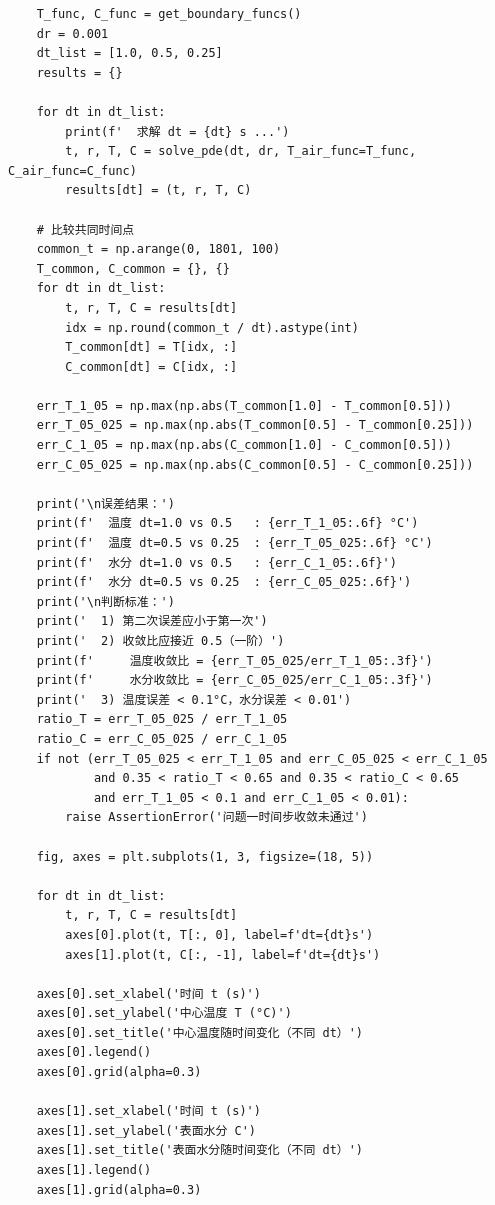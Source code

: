 \documentclass[withoutpreface,bwprint]{cumcm_thesis}
\begin{document}
\begin{appendices}
\begin{lstlisting}
    T_func, C_func = get_boundary_funcs()
    dr = 0.001
    dt_list = [1.0, 0.5, 0.25]
    results = {}

    for dt in dt_list:
        print(f'  求解 dt = {dt} s ...')
        t, r, T, C = solve_pde(dt, dr, T_air_func=T_func, C_air_func=C_func)
        results[dt] = (t, r, T, C)

    # 比较共同时间点
    common_t = np.arange(0, 1801, 100)
    T_common, C_common = {}, {}
    for dt in dt_list:
        t, r, T, C = results[dt]
        idx = np.round(common_t / dt).astype(int)
        T_common[dt] = T[idx, :]
        C_common[dt] = C[idx, :]

    err_T_1_05 = np.max(np.abs(T_common[1.0] - T_common[0.5]))
    err_T_05_025 = np.max(np.abs(T_common[0.5] - T_common[0.25]))
    err_C_1_05 = np.max(np.abs(C_common[1.0] - C_common[0.5]))
    err_C_05_025 = np.max(np.abs(C_common[0.5] - C_common[0.25]))

    print('\n误差结果：')
    print(f'  温度 dt=1.0 vs 0.5   : {err_T_1_05:.6f} °C')
    print(f'  温度 dt=0.5 vs 0.25  : {err_T_05_025:.6f} °C')
    print(f'  水分 dt=1.0 vs 0.5   : {err_C_1_05:.6f}')
    print(f'  水分 dt=0.5 vs 0.25  : {err_C_05_025:.6f}')
    print('\n判断标准：')
    print('  1) 第二次误差应小于第一次')
    print('  2) 收敛比应接近 0.5（一阶）')
    print(f'     温度收敛比 = {err_T_05_025/err_T_1_05:.3f}')
    print(f'     水分收敛比 = {err_C_05_025/err_C_1_05:.3f}')
    print('  3) 温度误差 < 0.1°C，水分误差 < 0.01')
    ratio_T = err_T_05_025 / err_T_1_05
    ratio_C = err_C_05_025 / err_C_1_05
    if not (err_T_05_025 < err_T_1_05 and err_C_05_025 < err_C_1_05
            and 0.35 < ratio_T < 0.65 and 0.35 < ratio_C < 0.65
            and err_T_1_05 < 0.1 and err_C_1_05 < 0.01):
        raise AssertionError('问题一时间步收敛未通过')

    fig, axes = plt.subplots(1, 3, figsize=(18, 5))

    for dt in dt_list:
        t, r, T, C = results[dt]
        axes[0].plot(t, T[:, 0], label=f'dt={dt}s')
        axes[1].plot(t, C[:, -1], label=f'dt={dt}s')

    axes[0].set_xlabel('时间 t (s)')
    axes[0].set_ylabel('中心温度 T (°C)')
    axes[0].set_title('中心温度随时间变化（不同 dt）')
    axes[0].legend()
    axes[0].grid(alpha=0.3)

    axes[1].set_xlabel('时间 t (s)')
    axes[1].set_ylabel('表面水分 C')
    axes[1].set_title('表面水分随时间变化（不同 dt）')
    axes[1].legend()
    axes[1].grid(alpha=0.3)


\end{lstlisting}
\end{appendices}
\end{document}
